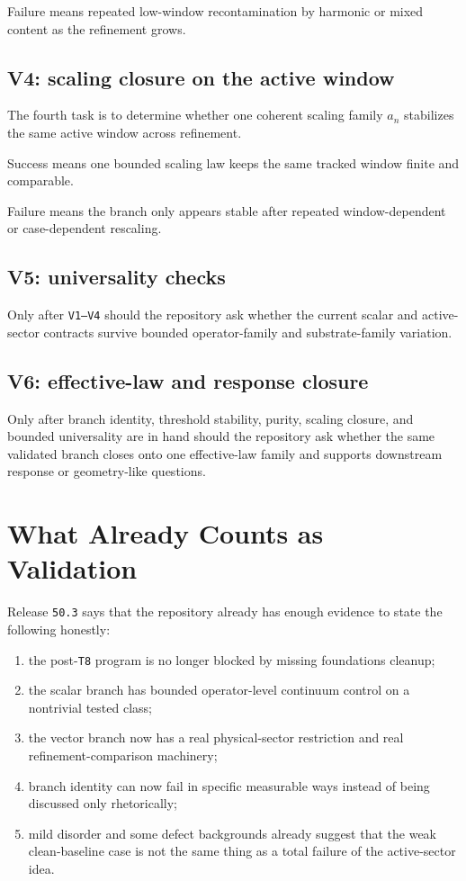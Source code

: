 \documentclass[11pt]{article}
\begin{document}
Failure means repeated low-window recontamination by harmonic or mixed content as the refinement grows.

\subsection{V4: scaling closure on the active window}

The fourth task is to determine whether one coherent scaling family \(a_n\) stabilizes the same active window across refinement.

Success means one bounded scaling law keeps the same tracked window finite and comparable.

Failure means the branch only appears stable after repeated window-dependent or case-dependent rescaling.

\subsection{V5: universality checks}

Only after \texttt{V1--V4} should the repository ask whether the current scalar and active-sector contracts survive bounded operator-family and substrate-family variation.

\subsection{V6: effective-law and response closure}

Only after branch identity, threshold stability, purity, scaling closure, and bounded universality are in hand should the repository ask whether the same validated branch closes onto one effective-law family and supports downstream response or geometry-like questions.

\section{What Already Counts as Validation}

Release \texttt{50.3} says that the repository already has enough evidence to state the following honestly:
\begin{enumerate}
\item the post-\texttt{T8} program is no longer blocked by missing foundations cleanup;
\item the scalar branch has bounded operator-level continuum control on a nontrivial tested class;
\item the vector branch now has a real physical-sector restriction and real refinement-comparison machinery;
\item branch identity can now fail in specific measurable ways instead of being discussed only rhetorically;
\item mild disorder and some defect backgrounds already suggest that the weak clean-baseline case is not the same thing as a total failure of the active-sector idea.
\end{enumerate}
\end{document}
